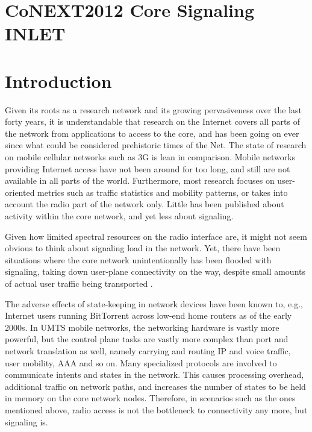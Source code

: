 \section{CoNEXT2012 Core Signaling INLET}


\section{Introduction}
\label{sec:introduction-CONEXT}

Given its roots as a research network and its growing pervasiveness over the last forty years, it is understandable that research on the Internet covers all parts of the network from applications to access to the core, and has been going on ever since what could be considered prehistoric times of the Net. The state of research on mobile cellular networks such as 3G is lean in comparison. Mobile networks providing Internet access have not been around for too long, and still are not available in all parts of the world. Furthermore, most research focuses on user-oriented metrics such as traffic statistics and mobility patterns, or takes into account the radio part of the network only. Little has been published about activity within the core network, and yet less about signaling.

Given how limited spectral resources on the radio interface are, it might not seem obvious to think about signaling load in the network. Yet, there have been situations where the core network unintentionally has been flooded with signaling, taking down user-plane connectivity on the way, despite small amounts of actual user traffic being transported \cite{lt2012docostorm, it2011birdandroid}. 

The adverse effects of state-keeping in network devices have been known to, e.g.,  Internet users running BitTorrent across low-end home routers as of the early 2000s. In \ac{UMTS} mobile networks, the networking hardware is vastly more powerful, but the control plane tasks are vastly more complex than port and network translation as well, namely carrying and routing IP and voice traffic, user mobility, \ac{AAA} and so on. Many specialized protocols are involved to communicate intents and states in the network. This causes processing overhead, additional traffic on network paths, and increases the number of states to be held in memory on the core network nodes. Therefore, in scenarios such as the ones mentioned above, radio access is not the bottleneck to connectivity any more, but signaling is.

